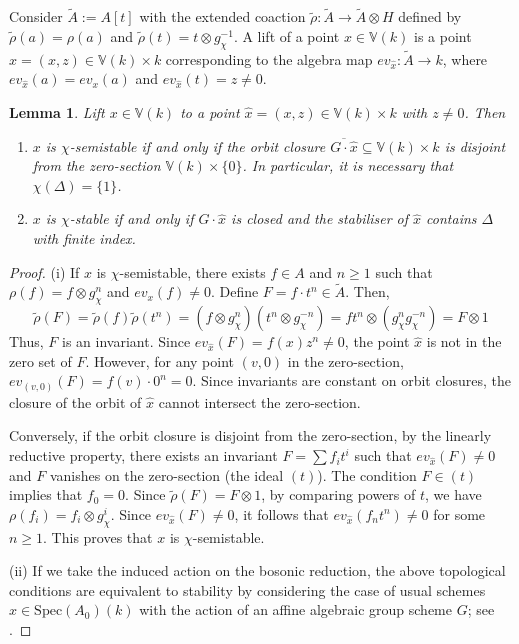 \documentclass[12pt, reqno]{amsart}
\theoremstyle{plain}
\newtheorem{lemma}[theorem]{Lemma}
\numberwithin{equation}{section}
\begin{document}
Consider $\tilde{A} := A[t]$ with the extended coaction $\tilde{\rho} : \tilde{A} \to \tilde{A} \otimes H$ defined by $\tilde{\rho}(a) = \rho(a)$ and $\tilde{\rho}(t) = t \otimes g_{\chi}^{-1}$. A lift of a point $x\in \mathbb{V}(k)$ is a point $\hat{x} = (x,z) \in \mathbb{V}(k) \times k$ corresponding to the algebra map $ev_{\hat{x}} : \tilde{A} \to k$, where $ev_{\hat{x}}(a) = ev_x(a)$ and $ev_{\hat{x}}(t) = z \neq 0$.

\begin{lemma}\label{lemma-ss-criterion}
Lift $x \in \mathbb{V}(k)$ to a point $\hat{x} = (x,z) \in \mathbb{V}(k) \times k$ with $z \ne 0$. Then
\begin{enumerate}
    \item[(i)] $x$ is $\chi$-semistable if and only if the orbit closure $\overline{G \cdot \hat{x}} \subseteq \mathbb{V}(k) \times k$ is disjoint from the zero-section $\mathbb{V}(k) \times \{0\}$. In particular, it is necessary that $\chi(\Delta)=\{1\}$.
    \item[(ii)] $x$ is $\chi$-stable if and only if $G \cdot \hat{x}$ is closed and the stabiliser of $\hat{x}$ contains $\Delta$ with finite index.
\end{enumerate}
\end{lemma}
\begin{proof}
(i) If $x$ is $\chi$-semistable, there exists $f \in A$ and $n \geq 1$ such that $\rho(f) = f \otimes g_{\chi}^n$ and $ev_x(f) \neq 0$. Define $F = f \cdot t^n \in \tilde{A}$. Then,
\[
\tilde{\rho}(F) = \tilde{\rho}(f) \tilde{\rho}(t^n) = (f \otimes g_{\chi}^n)(t^n \otimes g_{\chi}^{-n}) = f t^n \otimes (g_{\chi}^n g_{\chi}^{-n}) = F \otimes 1
\]
Thus, $F$ is an invariant. Since $ev_{\hat{x}}(F) = f(x)z^n \neq 0$, the point $\hat{x}$ is not in the zero set of $F$. However, for any point $(v, 0)$ in the zero-section, $ev_{(v, 0)}(F) = f(v) \cdot 0^n = 0$. Since invariants are constant on orbit closures, the closure of the orbit of $\hat{x}$ cannot intersect the zero-section.

Conversely, if the orbit closure is disjoint from the zero-section, by the linearly reductive property, there exists an invariant $F = \sum f_i t^i$ such that $ev_{\hat{x}}(F) \neq 0$ and $F$ vanishes on the zero-section (the ideal $(t)$). The condition $F \in (t)$ implies that $f_0 = 0$. Since $\tilde{\rho}(F) = F \otimes 1$, by comparing powers of $t$, we have $\rho(f_i) = f_i \otimes g_{\chi}^i$. Since $ev_{\hat{x}}(F) \neq 0$, it follows that $ev_{\hat{x}}(f_n t^n) \neq 0$ for some $n\ge 1$. This proves that $x$ is $\chi$-semistable.

(ii) 
If we take the induced action on the bosonic reduction, the above topological conditions are equivalent to stability by considering the case of usual schemes $x \in \mbox{Spec}(A_0)(k)$ with the action of an affine algebraic group scheme $G$; see \cite[Lemma 2.2]{Ki94}.
\end{proof}
\end{document}
